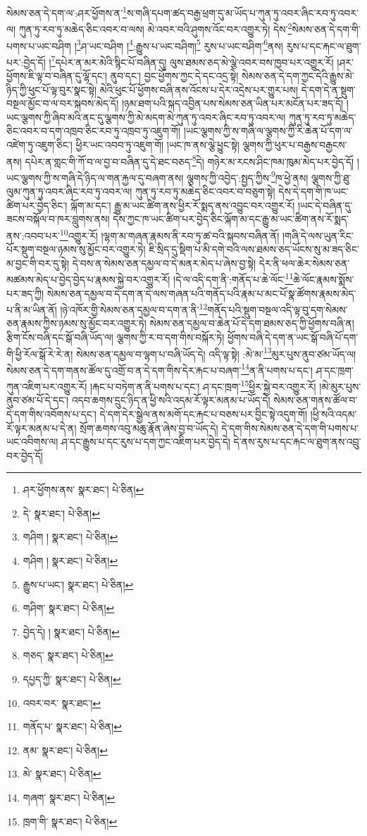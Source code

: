 སེམས་ཅན་དེ་དག་ལ་:ཤར་ཕྱོགས་ན་\footnote{ཤར་ཕྱོགས་ནས་  སྣར་ཐང་།  པེ་ཅིན། }ས་གཞི་དཔག་ཚད་བརྒྱ་ཕྲག་དུ་མ་ཡོད་པ་ཀུན་ཏུ་འབར་ཞིང་རབ་ཏུ་འབར་ལ། ཀུན་ཏུ་རབ་ཏུ་མཆེད་ཅིང་འབར་བ་ལས། མེ་འབར་བའི་ཤུགས་འོང་བར་འགྱུར་ཏེ། དེས་\footnote{དེ་  སྣར་ཐང་།  པེ་ཅིན། }སེམས་ཅན་དེ་དག་གི་པགས་པ་ཡང་བཤིག །\footnote{གཤིག །  སྣར་ཐང་།  པེ་ཅིན། }ཤ་ཡང་བཤིག །\footnote{གཤིག །  སྣར་ཐང་།  པེ་ཅིན། }:རྒྱུས་པ་ཡང་བཤིག།\footnote{རྒྱུས་པ་ཡང་།  སྣར་ཐང་།  པེ་ཅིན། } རུས་པ་ཡང་བཤིག་\footnote{གཤིག་  སྣར་ཐང་།  པེ་ཅིན། }ནས། རུས་པ་དང་རྐང་ལ་ཐུག་པར་:བྱེད་དོ། །\footnote{བྱེད་དེ། །  སྣར་ཐང་།  པེ་ཅིན། }དཔེར་ན་མར་མེའི་སྙིང་པོ་བཞིན་དུ། ལུས་ཐམས་ཅད་མེ་ལྕེ་འབར་བས་ཁྱབ་པར་འགྱུར་རོ། །ཤར་ཕྱོགས་ཇི་ལྟ་བ་བཞིན་དུ་ལྷོ་དང་། ནུབ་དང་། བྱང་ཕྱོགས་ཀྱང་དེ་དང་འདྲ་སྟེ། སེམས་ཅན་དེ་དག་ཀྱང་དེའི་རྒྱུས་མེ་ཉིད་ཀྱི་ཕུང་པོ་ལྟ་བུར་སྣང་སྟེ། མེའི་ཕུང་པོ་ཕྱོགས་བཞི་ནས་འོངས་པ་དེར་འདྲེས་པར་གྱུར་པས། དེ་དག་དེ་ན་སྡུག་བསྔལ་མྱོང་བ་ལ་བར་སྐབས་མེད་དོ། །ཉམ་ཐག་པའི་སྐད་འབྱིན་པས་སེམས་ཅན་ཡིན་པར་མངོན་པར་ཟད་དོ། །ཡང་ལྕགས་ཀྱི་ཞིབ་མའི་ནང་དུ་ལྕགས་ཀྱི་མེ་མདག་མེ་ཀུན་ཏུ་འབར་ཞིང་རབ་ཏུ་འབར་ལ། ཀུན་ཏུ་རབ་ཏུ་མཆེད་ཅིང་འབར་བ་དག་འཁྲབ་ཅིང་རབ་ཏུ་འཁྲབ་ཏུ་འཇུག་གོ། །ཡང་ལྕགས་ཀྱི་ས་གཞི་ལ་ལྕགས་ཀྱི་རི་ཆེན་པོ་དག་ལ་འཛེག་ཏུ་འཇུག་ཅིང་། ཕྱིར་ཡང་འབབ་ཏུ་འཇུག་གོ། །ཡང་ཁ་ནས་ལྕེ་ཕྱུང་སྟེ། ལྕགས་ཀྱི་ཕུར་པ་བརྒྱས་བརྒྱངས་ནས། དཔེར་ན་གླང་གི་ཀོ་བ་ལ་བྱ་བ་བཞིན་དུ་དེ་ཐང་བཅད་\footnote{གཅད་  སྣར་ཐང་།  པེ་ཅིན། }དེ། གཉེར་མ་རངས་ཤིང་ཁམ་ཁུམ་མེད་པར་བྱེད་དོ། །ཡང་ལྕགས་ཀྱི་ས་གཞི་དེ་ཉིད་ལ་གན་རྐྱལ་དུ་བཞག་ནས། ལྕགས་ཀྱི་འབྱེད་:སྤྱད་ཀྱིས་\footnote{དཔྱད་ཀྱི་  སྣར་ཐང་།  པེ་ཅིན། }ཁ་ཕྱེ་ནས། ལྕགས་ཀྱི་ཐུ་ལུམ་ཀུན་ཏུ་འབར་ཞིང་རབ་ཏུ་འབར་ལ། ཀུན་ཏུ་རབ་ཏུ་མཆེད་ཅིང་འབར་བ་བཅུག་སྟེ། དེས་དེ་དག་གི་ཁ་ཡང་ཚིག་པར་བྱེད་ཅིང་། ལྐོག་མ་དང་། རྒྱུ་མ་ཡང་ཚིག་ནས་ཕྱིར་རོ་སྨད་ནས་འབྱུང་བར་འགྱུར་རོ། །ཡང་དེ་བཞིན་དུ་ཟངས་བསྐོལ་བ་ཁར་བླུགས་ནས། དེས་ཀྱང་ཁ་ཡང་ཚིག་པར་བྱེད་ཅིང་ལྐོག་མ་དང་རྒྱུ་མ་ཡང་ཚིག་ནས་རོ་སྨད་ནས་:འབབ་པར་\footnote{འབར་བར་  སྣར་ཐང་། }འགྱུར་རོ། །ལྷག་མ་གཞན་རྣམས་ནི་རབ་ཏུ་ཚ་བའི་སྐབས་བཞིན་ནོ། །གཞི་དེ་ལས་ཡུན་རིང་པོར་སྡུག་བསྔལ་ཉམས་སུ་མྱོང་བར་འགྱུར་ཏེ། ཇི་སྲིད་དུ་སྡིག་པ་མི་དགེ་བའི་ལས་ཐམས་ཅད་ཡོངས་སུ་མ་ཟད་ཅིང་མ་བྱང་གི་བར་དུ་སྟེ། དེ་བས་ན་སེམས་ཅན་དམྱལ་བ་དེ་མནར་མེད་པ་ཞེས་བྱ་སྟེ། དེར་ནི་ཕལ་ཆེར་སེམས་ཅན་མཚམས་མེད་པ་བྱེད་བྱེད་པ་རྣམས་སྐྱེ་བར་འགྱུར་རོ། །དེ་ལ་འདི་དག་ནི་:གནོད་པ་ཆེ་ལོང་\footnote{གནོད་པ་  སྣར་ཐང་།  པེ་ཅིན། }ཆེ་ལོང་རྣམས་སྨོས་པར་ཟད་ཀྱི། སེམས་ཅན་དམྱལ་བ་དེ་དག་ན་དེ་ལས་གཞན་པའི་གནོད་པའི་རྣམ་པ་མང་པོ་སྣ་ཚོགས་རྣམས་མེད་པ་ནི་མ་ཡིན་ནོ། །ཉེ་འཁོར་གྱི་སེམས་ཅན་དམྱལ་བ་དག་ན་ནི་\footnote{ནམ་  སྣར་ཐང་།  པེ་ཅིན། }གནོད་པའི་སྡུག་བསྔལ་འདི་ལྟ་བུ་དག་སེམས་ཅན་རྣམས་ཀྱིས་ཉམས་སུ་མྱོང་བར་འགྱུར་ཏེ། སེམས་ཅན་དམྱལ་བ་ཆེན་པོ་དེ་དག་ཐམས་ཅད་ཀྱི་ཕྱོགས་བཞི་ན། རྩིག་ངོས་བཞི་དང་སྒོ་བཞི་ཡོད་ལ། ལྕགས་ཀྱི་ར་བ་དག་གིས་བསྐོར་ཏེ། ཕྱོགས་བཞི་དེ་དག་ན་ཡང་སྒོ་བཞི་པོ་དག་གི་ཕྱི་རོལ་སྒོ་རེ་རེ་ན། སེམས་ཅན་དམྱལ་བ་ལྷག་པ་བཞི་ཡོད་དེ། འདི་ལྟ་སྟེ། :མེ་མ་\footnote{མེ་  སྣར་ཐང་།  པེ་ཅིན། }མུར་པུས་ནུབ་ཙམ་ཡོད་ལ། སེམས་ཅན་དེ་དག་གནས་ཚོལ་དུ་འགྲོ་བ་ན་དེ་དག་གིས་དེར་རྐང་པ་བཞག་\footnote{གཞག་  སྣར་ཐང་།  པེ་ཅིན། }ན་ནི་པགས་པ་དང་། ཤ་དང་ཁྲག་ཀུན་འཇིག་པར་འགྱུར་རོ། །རྐང་པ་བཏེག་ན་ནི་པགས་པ་དང་། ཤ་དང་ཁྲག་\footnote{ཁྲག་གི་  སྣར་ཐང་།  པེ་ཅིན། }ཕྱིར་སྐྱེ་བར་འགྱུར་རོ། །མེ་མུར་པུས་ནུབ་ཙམ་པོ་དེ་དང་། འདབ་ཆགས་དྲུང་ཉིད་ན་ཕྱི་སའི་འདམ་རོ་ལྟར་མནམ་པ་ཡོད་དེ། སེམས་ཅན་གནས་ཚོལ་བ་དེ་དག་གིས་འབོགས་པ་དང་། དེ་དག་དེར་སྒྱེལ་ནས་མགོ་དང་རྐང་པ་བཅས་པར་བྱིང་སྟེ་འདུག་གོ། །ཕྱི་སའི་འདམ་རོ་ལྟར་མནམ་པ་དེ་ན། སྲོག་ཆགས་འབུ་མཆུ་རྣོན་ཞེས་བྱ་བ་ཡོད་དེ། དེ་དག་གིས་སེམས་ཅན་དེ་དག་གི་པགས་པ་ཡང་འབིགས་ལ། ཤ་དང་རྒྱུས་པ་དང་རུས་པ་དག་ཀྱང་འཇིག་པར་བྱེད་དེ། དེ་ནས་རུས་པ་དང་རྐང་ལ་ཐུག་ནས་འབྲུ་བར་བྱེད་དོ། 